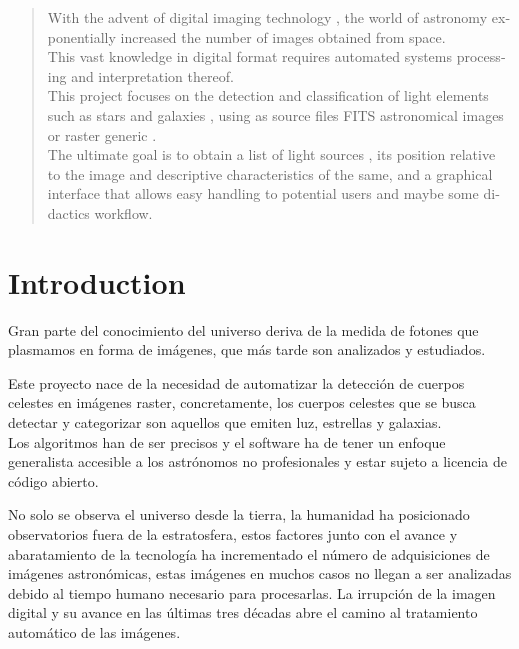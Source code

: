 	
	\begin{otherlanguage}{english}
	\begin{abstract}
		With the advent of digital imaging technology , the world of astronomy exponentially increased the number of images obtained from space.\\
		This vast knowledge in digital format requires automated systems processing and interpretation thereof.\\
		This project focuses on the detection and classification of light elements such as stars and galaxies , using as source files FITS astronomical images or raster generic .\\
		The ultimate goal is to obtain a list of light sources , its position relative to the image and descriptive characteristics of the same,  and a graphical interface that allows easy handling to potential users and maybe some didactics workflow.\\
	\end{abstract}
	\end{otherlanguage}
	\vfill %
	
	
	\tableofcontents
	\newpage
	
	\section{Introduction}
	
	Gran parte del conocimiento del universo deriva de la medida de fotones que plasmamos en forma de imágenes, que más tarde son analizados y estudiados. 
	
	Este proyecto nace de la necesidad de automatizar la detección de cuerpos celestes en imágenes raster, concretamente, los cuerpos celestes que se busca detectar y categorizar son aquellos que emiten luz, estrellas y galaxias. \\
	Los algoritmos han de ser precisos y el software ha de tener un enfoque generalista accesible a los astrónomos no profesionales y estar sujeto a licencia de código abierto.
	
	No solo se observa el universo desde la tierra, la humanidad ha posicionado observatorios fuera de la estratosfera, estos factores junto con el avance y abaratamiento de la tecnología ha incrementado el número de adquisiciones de imágenes astronómicas, estas imágenes en muchos casos no llegan a ser analizadas debido al tiempo humano necesario para procesarlas. La irrupción de la imagen digital y su avance en las últimas tres décadas abre el camino al tratamiento automático de las imágenes.
	
